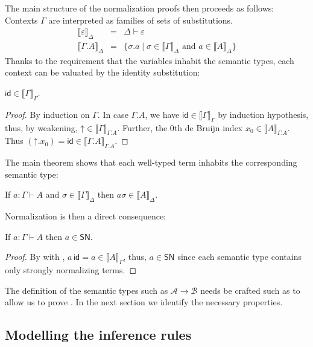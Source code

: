 \documentclass[a4paper,USenglish,cleveref, autoref, thm-restate]{lipics-v2019}
\newcommand{\den}[2][]{\llbracket#2\rrbracket^{#1}}
\newcommand{\tid}{\mathsf{id}}
\newcommand{\Den}[2]{\den{#1}_{#2}}
\newcommand{\Ge}{\ensuremath{\varepsilon}}
\newcommand{\Gs}{\ensuremath{\sigma}}
\newcommand{\A}{\mathcal{A}}
\newcommand{\B}{\mathcal{B}}
\newcommand{\SN}{\mathsf{SN}}
\newcommand{\up}{\mathord{\uparrow}}
\begin{document}
The main structure of the normalization proofs then proceeds as follows:
Contexts $\Gamma$ are interpreted as families of sets of
substitutions.
\[
  \begin{array}{lll}
\Den \Ge \Delta & = & \Delta \vdash \Ge \\
\Den{\Gamma.A} \Delta & = & \{ \Gs.a \mid \Gs \in \Den \Gamma \Delta
                            \mbox{ and } a \in \Den A \Delta \}
  \end{array}
\]
Thanks to the requirement that the variables inhabit the semantic
types, each context can be valuated by the identity substitution:
\begin{lemma}
  \label{lem:id}
  $\tid \in \Den \Gamma \Gamma$.
\end{lemma}
\begin{proof}
  By induction on $\Gamma$.  In case $\Gamma.A$, we have
  $\tid \in \Den \Gamma \Gamma$ by induction hypothesis, thus, by
  weakening, ${\up} \in \Den\Gamma{\Gamma.A}$.  Further, the 0th de
  Bruijn index $x_0 \in \Den A {\Gamma.A}$.
  Thus $(\up.x_0) = \tid \in \Den{\Gamma.A}{\Gamma.A}$.
\end{proof}

The main theorem shows that each well-typed term inhabits the corresponding semantic type:
\begin{theorem}
  \label{thm:fund}
  If $a : \Gamma \vdash A$ and $\Gs \in \Den \Gamma \Delta$ then $a
  \sigma \in \Den A \Delta$.
\end{theorem}
Normalization is then a direct consequence:
\begin{corollary}
  If $a : \Gamma \vdash A$ then $a \in \SN$.
\end{corollary}
\begin{proof}
  By  with , $a\, \tid = a \in \Den A
  \Gamma$, thus, $a \in \SN$ since each semantic type contains only
  strongly normalizing terms.
\end{proof}

The definition of the semantic types such as $\A \to \B$ needs be
crafted such as to allow us to prove .
In the next section we identify the necessary properties.

\subsection{Modelling the inference rules}
\end{document}

